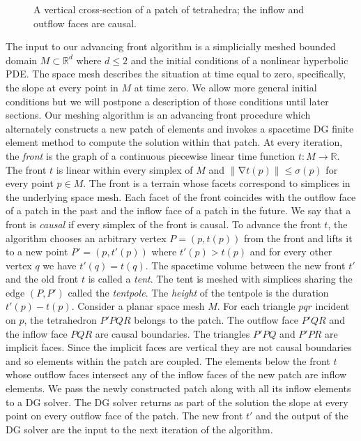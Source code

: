 \documentclass[twocolumn]{article}
\def\fig#1{fig/#1}
\newif\iffig
\def\Real{\ensuremath{\mathbb{R}}}
\def\S{\ensuremath{\sigma}}
\def\sp{\ensuremath{M}}
\def\p{\ensuremath{p}}
\def\q{\ensuremath{q}}
\def\fp{\ensuremath{P}}
\def\fq{\ensuremath{Q}}
\def\fr{\ensuremath{R}}
\DeclareMathOperator{\grad}{\ensuremath{\nabla}}
\def\norm#1{\ensuremath{\mathopen\| #1 \mathclose\|}}
\begin{document}
\begin{figure}\centering\footnotesize\sf
\iffig\texttt{[image: \\fig\{patch]}}\fi
\caption{A vertical cross-section
  of a patch of tetrahedra; the inflow and outflow faces are causal.}
\label{fig:patch}
\end{figure}




The input to our advancing front algorithm is a simplicially meshed
bounded domain $\sp \subset \Real^d$ where $d \le 2$ and the initial
conditions of a nonlinear hyperbolic PDE.  The space mesh describes
the situation at time equal to zero, specifically, the slope at every
point in $\sp$ at time zero.  We allow more general initial conditions
but we will postpone a description of those conditions until later
sections.  Our meshing algorithm is an advancing front procedure which
alternately constructs a new patch of elements and invokes a spacetime
DG finite element method to compute the solution within that patch.
At every iteration, the \emph{front} is the graph of a continuous
piecewise linear time function $t: \sp \to \Real$.  The front $t$ is
linear within every simplex of $\sp$ and $\norm{\grad t(\p)} \le
\S(\p)$ for every point $\p \in \sp$.  The front is a terrain whose
facets correspond to simplices in the underlying space mesh.  Each
facet of the front coincides with the outflow face of a patch in the
past and the inflow face of a patch in the future.  We say that a
front is \emph{causal} if every simplex of the front is causal.  To
advance the front $t$, the algorithm chooses an arbitrary vertex $\fp
= (\p, t(\p))$ from the front and lifts it to a new point $\fp' = (\p,
t'(\p))$ where $t'(\p) > t(\p)$ and for every other vertex $\q$ we
have $t'(\q) = t(\q)$.  The spacetime volume between the new front
$t'$ and the old front $t$ is called a \emph{tent}.  The tent is
meshed with simplices sharing the edge $(\fp, \fp')$ called the
\emph{tentpole}.  The \emph{height} of the tentpole is the duration
$t'(\p) - t(\p)$.  Consider a planar space mesh $\sp$.  For each
triangle $pqr$ incident on $p$, the tetrahedron $\fp'\fp\fq\fr$
belongs to the patch.  The outflow face $\fp'\fq\fr$ and the inflow
face $\fp\fq\fr$ are causal boundaries.  The triangles $\fp'\fp\fq$
and $\fp'\fp\fr$ are implicit faces.  Since the implicit faces are
vertical they are not causal boundaries and so elements within the
patch are coupled.  The elements below the front $t$ whose outflow
faces intersect any of the inflow faces of the new patch are inflow
elements.  We pass the newly constructed patch along with all its
inflow elements to a DG solver.  The DG solver returns as part of the
solution the slope at every point on every outflow face of the patch.
The new front $t'$ and the output of the DG solver are the input to
the next iteration of the algorithm.
\end{document}

